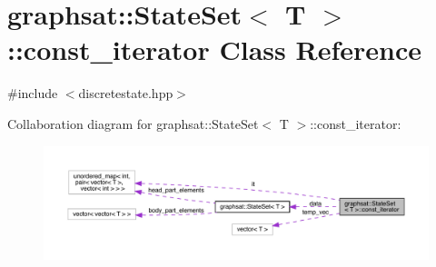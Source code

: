 \hypertarget{classgraphsat_1_1_state_set_1_1const__iterator}{}\section{graphsat\+::State\+Set$<$ T $>$\+::const\+\_\+iterator Class Reference}
\label{classgraphsat_1_1_state_set_1_1const__iterator}


{\ttfamily \#include $<$discretestate.\+hpp$>$}



Collaboration diagram for graphsat\+::State\+Set$<$ T $>$\+::const\+\_\+iterator\+:
\nopagebreak
\begin{figure}[H]
\begin{center}
\leavevmode
\includegraphics[width=350pt]{classgraphsat_1_1_state_set_1_1const__iterator__coll__graph}
\end{center}
\end{figure}
